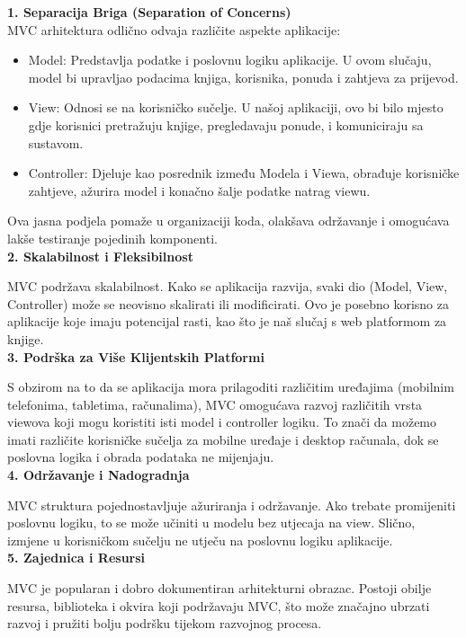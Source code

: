  \textbf{1. Separacija Briga (Separation of Concerns)}\\

MVC arhitektura odlično odvaja različite aspekte aplikacije:
\begin{itemize}
		  \item {Model: Predstavlja podatke i poslovnu logiku aplikacije. U ovom slučaju, model bi upravljao podacima knjiga, korisnika, ponuda i zahtjeva za prijevod.}
		  \item {View: Odnosi se na korisničko sučelje. U našoj aplikaciji, ovo bi bilo mjesto gdje korisnici pretražuju knjige, pregledavaju ponude, i komuniciraju sa sustavom.}	
            \item {Controller: Djeluje kao posrednik između Modela i Viewa, obrađuje korisničke zahtjeve, ažurira model i konačno šalje podatke natrag viewu.}
	   \end{itemize}

Ova jasna podjela pomaže u organizaciji koda, olakšava održavanje i omogućava lakše testiranje pojedinih komponenti.
	\\

 \textbf{2. Skalabilnost i Fleksibilnost}

MVC podržava skalabilnost. Kako se aplikacija razvija, svaki dio (Model, View, Controller) može se neovisno skalirati ili modificirati. Ovo je posebno korisno za aplikacije koje imaju potencijal rasti, kao što je naš slučaj s web platformom za knjige.
	\\

 \textbf{3. Podrška za Više Klijentskih Platformi}

S obzirom na to da se aplikacija mora prilagoditi različitim uređajima (mobilnim telefonima, tabletima, računalima), MVC omogućava razvoj različitih vrsta viewova koji mogu koristiti isti model i controller logiku. To znači da možemo imati različite korisničke sučelja za mobilne uređaje i desktop računala, dok se poslovna logika i obrada podataka ne mijenjaju.
	\\

 \textbf{4. Održavanje i Nadogradnja}

MVC struktura pojednostavljuje ažuriranja i održavanje. Ako trebate promijeniti poslovnu logiku, to se može učiniti u modelu bez utjecaja na view. Slično, izmjene u korisničkom sučelju ne utječu na poslovnu logiku aplikacije.
	\\
	
 \textbf{5. Zajednica i Resursi}

MVC je popularan i dobro dokumentiran arhitekturni obrazac. Postoji obilje resursa, biblioteka i okvira koji podržavaju MVC, što može značajno ubrzati razvoj i pružiti bolju podršku tijekom razvojnog procesa.

